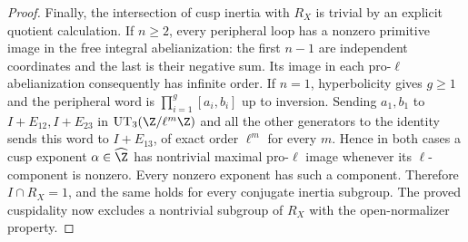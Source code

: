 \begin{proof}
Finally, the intersection of cusp inertia with $R_X$ is trivial by
an explicit quotient calculation. If $n\geq2$, every peripheral
loop has a nonzero primitive image in the free integral
abelianization: the first $n-1$ are independent coordinates and
the last is their negative sum. Its image in each pro-$\ell$
abelianization consequently has infinite order. If $n=1$,
hyperbolicity gives $g\geq1$ and the peripheral word is
$\prod_{i=1}^g[a_i,b_i]$ up to inversion. Sending $a_1,b_1$ to
$I+E_{12},I+E_{23}$ in $\operatorname{UT}_3(\Z/\ell^m\Z)$
and all the other generators to the identity sends this word to
$I+E_{13}$, of exact order $\ell^m$ for every $m$. Hence in both
cases a cusp exponent $\alpha\in\widehat\Z$ has nontrivial
maximal pro-$\ell$ image whenever its $\ell$-component is
nonzero. Every nonzero exponent has such a component. Therefore
$I\cap R_X=1$, and the same holds for every conjugate inertia
subgroup. The proved cuspidality now excludes a nontrivial subgroup
of $R_X$ with the open-normalizer property.
\end{proof}



